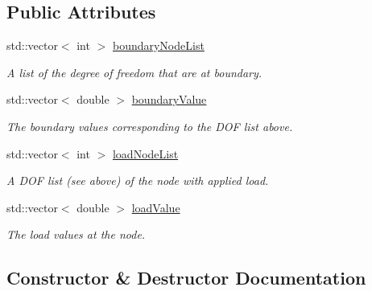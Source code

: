 \subsection*{Public Attributes}
\begin{DoxyCompactItemize}
\item 
std\+::vector$<$ int $>$ \mbox{\hyperlink{class_mesh_a5a1c5739ef85c8f9071f689e790b5251}{boundary\+Node\+List}}
\begin{DoxyCompactList}\small\item\em A list of the degree of freedom that are at boundary. \end{DoxyCompactList}\item 
\mbox{\label{class_mesh_ab331f3e3efeb2934c202b07db8a6c1a5}} 
std\+::vector$<$ double $>$ \mbox{\hyperlink{class_mesh_ab331f3e3efeb2934c202b07db8a6c1a5}{boundary\+Value}}
\begin{DoxyCompactList}\small\item\em The boundary values corresponding to the D\+OF list above. \end{DoxyCompactList}\item 
\mbox{\label{class_mesh_ad54254084b97877bb4d0f9d9d9cbb380}} 
std\+::vector$<$ int $>$ \mbox{\hyperlink{class_mesh_ad54254084b97877bb4d0f9d9d9cbb380}{load\+Node\+List}}
\begin{DoxyCompactList}\small\item\em A D\+OF list (see above) of the node with applied load. \end{DoxyCompactList}\item 
\mbox{\label{class_mesh_a688adb457f52ffa939f53f22afae697e}} 
std\+::vector$<$ double $>$ \mbox{\hyperlink{class_mesh_a688adb457f52ffa939f53f22afae697e}{load\+Value}}
\begin{DoxyCompactList}\small\item\em The load values at the node. \end{DoxyCompactList}\end{DoxyCompactItemize}


\subsection{Constructor \& Destructor Documentation}
\mbox{\label{class_mesh_af9ff79e2003cfde74b16266cd8113acf}} 
